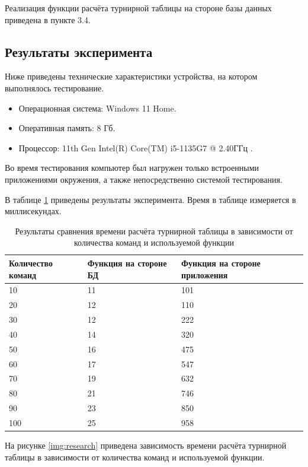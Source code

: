 Реализация функции расчёта турнирной таблицы на стороне базы данных приведена в пункте 3.4.

\subsection{Результаты эксперимента}

Ниже приведены технические характеристики устройства, на котором выполнялось тестирование.

\begin{itemize}
	\item Операционная система: Windows 11 Home.
	\item Оперативная память: 8 Гб.
	\item Процессор: 11th Gen Intel(R) Core(TM) i5-1135G7 @ 2.40ГГц \cite{proc}.
\end{itemize}

Во время тестирования компьютер был нагружен только встроенными приложениями окружения, а также непосредственно системой тестирования.

В таблице \ref{res} приведены результаты эксперимента. Время в таблице измеряется в миллисекундах.
\newpage
\begin{table}[ht!]
	\centering
	\caption{Результаты сравнения времени расчёта турнирной таблицы в зависимости от количества команд и используемой функции}
	\label{res}
	\begin{tabular}{|p{3cm}|p{5cm}|p{5cm}|}
			\hline
			\textbf{Количество команд} & \textbf{Функция на стороне БД} & \textbf{Функция на стороне приложения}\\
			\hline
			10 & 11 & 101 \\
			\hline
			20 & 12 & 110 \\
			\hline
			30 & 12 & 222\\
			\hline
                40 & 14 & 320\\
			\hline
                50 & 16 & 475\\
			\hline
                60 & 17 & 547\\
			\hline
                70 & 19 & 632\\
			\hline
                80 & 21 & 746\\
			\hline
                90 & 23 & 850\\
			\hline
                100 & 25 & 958\\
			\hline
	\end{tabular}
\end{table}
На рисунке \ref{img:research} приведена зависимость времени расчёта турнирной таблицы в зависимости от количества команд и используемой функции.


